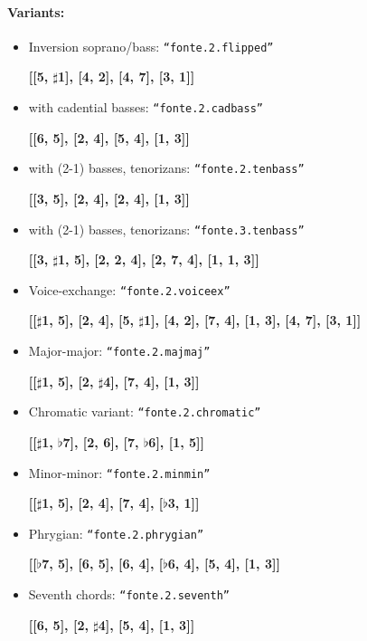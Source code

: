 ﻿\documentclass[11pt, openany]{article}
\begin{document}
\paragraph{Variants:}
\begin{itemize}
\item Inversion soprano/bass: \texttt{“fonte.2.flipped”}
	\begin{center}
	\textbf{[[5, $\sharp$1], [4, 2], [4, 7], [3, 1]]}
	\end{center}
\item with cadential basses: \texttt{“fonte.2.cadbass”}
	\begin{center}
	\textbf{[[6, 5], [2, 4], [5, 4], [1, 3]]}
	\end{center}
\item with (2-1) basses, tenorizans: \texttt{“fonte.2.tenbass”}
	\begin{center}
	\textbf{[[3, 5], [2, 4], [2, 4], [1, 3]]}
	\end{center}
\item with (2-1) basses, tenorizans: \texttt{“fonte.3.tenbass”}
	\begin{center}
	\textbf{[[3, $\sharp$1, 5], [2, 2, 4], [2, 7, 4], [1, 1, 3]]}
	\end{center}
\item Voice-exchange: \texttt{“fonte.2.voiceex”}
	\begin{center}
	\textbf{[[$\sharp$1, 5], [2, 4], [5, $\sharp$1], [4, 2], [7, 4], [1, 3], [4, 7], [3, 1]]}
	\end{center}
\item Major-major: \texttt{“fonte.2.majmaj”}
	\begin{center}
	\textbf{[[$\sharp$1, 5], [2, $\sharp$4], [7, 4], [1, 3]]}
	\end{center}
\item Chromatic variant: \texttt{“fonte.2.chromatic”}
	\begin{center}
	\textbf{[[$\sharp$1, $\flat$7], [2, 6], [7, $\flat$6], [1, 5]]}
	\end{center}
\item Minor-minor: \texttt{“fonte.2.minmin”}
	\begin{center}
	\textbf{[[$\sharp$1, 5], [2, 4], [7, 4], [$\flat$3, 1]]}
	\end{center}
\item Phrygian: \texttt{“fonte.2.phrygian”}
	\begin{center}
	\textbf{[[$\flat$7, 5], [6, 5], [6, 4], [$\flat$6, 4], [5, 4], [1, 3]]}
	\end{center}
\item Seventh chords: \texttt{“fonte.2.seventh”}
	\begin{center}
	\textbf{[[6, 5], [2, $\sharp$4], [5, 4], [1, 3]]}
	\end{center}
\end{itemize}
\end{document}
